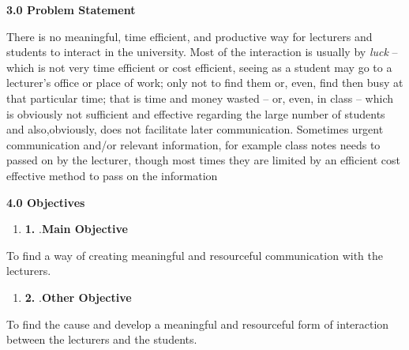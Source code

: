 \documentclass{article} %
\begin{document}
\noindent \textbf{3.0 Problem Statement}

\noindent There is no meaningful, time efficient, and productive way for lecturers and students to interact in the university. Most of the interaction is usually by \textit{luck }-- which is not very time efficient or cost efficient, seeing as a student may go to a lecturer's office or place of work; only not to find them or, even, find then busy at that particular time; that is time and money wasted --\textit{ }or, even, in class -- which is obviously not sufficient and effective regarding the large number of students and also,obviously, does not facilitate later communication. Sometimes urgent communication and/or relevant information, for example class notes needs to passed on by the lecturer, though most times they are limited by an efficient cost effective method to pass on the information

\noindent \textbf{4.0  Objectives}

\noindent \begin{enumerate}
\item \textbf{1. }.\textbf{Main Objective}
\end{enumerate}

\noindent To find a way of creating meaningful and resourceful communication with the lecturers. 

\noindent \begin{enumerate}
\item \textbf{2. }.\textbf{Other Objective}
\end{enumerate}

\noindent To find the cause and develop a meaningful and resourceful form of interaction between the lecturers and the students. 

\noindent 

\noindent 
\end{document}
